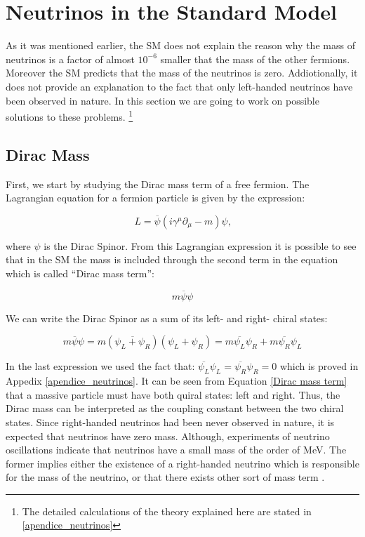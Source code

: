 \section{Neutrinos in the Standard Model}

As it was mentioned earlier, the SM does not explain the reason why the mass of neutrinos is a factor of almost $10^{-6}$ smaller that the mass of the other fermions. Moreover the SM predicts that
the mass of the neutrinos is zero. Addiotionally, it does not provide an explanation to the fact that only left-handed neutrinos have been observed in nature. 
In this section we are going to work on possible solutions to these problems. \footnote{The detailed calculations of the theory explained here are stated in \ref{apendice_neutrinos}}

\subsection{Dirac Mass}

First, we start by studying the Dirac mass term of a free fermion. The Lagrangian equation for a fermion particle is given by the expression:

\begin{equation}
 L = \overline{\psi} \left( i \gamma ^\mu \partial_{\mu} - m \right) \psi \text{,}
\end{equation}

where $\psi$ is the Dirac Spinor. From this Lagrangian expression it is possible to see that in the SM the mass is included through the second term in the equation which is called ``Dirac mass term'':

\begin{equation}
 m \overline{\psi} \psi
\end{equation}

We can write the Dirac Spinor as a sum of its left- and right- chiral states:

\begin{equation}\label{Dirac mass term}
 m \overline{\psi} \psi = m \left( \overbar{\psi_L + \psi_R} \right) \left( \psi_L + \psi_R \right) = m \overline{\psi_L} \psi_R + m \overline{\psi_R}\psi_L
\end{equation} 

In the last expression we used the fact that: $\overline{\psi_L}\psi_L = \overline{\psi_R}\psi_R = 0$ which is proved in Appedix \ref{apendice_neutrinos}. It can be seen from Equation \ref{Dirac mass term} that a massive particle must have both quiral states: left and right. Thus, the Dirac mass can be interpreted as the coupling constant between the two chiral states. Since right-handed 
neutrinos had been never observed in nature, it is expected that neutrinos have zero mass. Although, experiments of neutrino oscillations indicate that neutrinos have a small mass of 
the order of MeV. The former implies either the existence of a right-handed neutrino which is responsible for the mass of the neutrino, or that there exists other sort of mass term \cite{Theory_neutrinos}.

